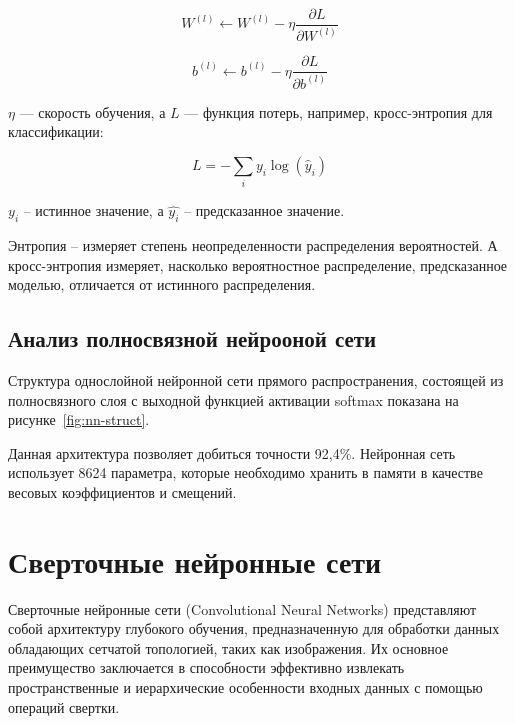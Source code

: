 \begin{equation}
    W^{(l)} \leftarrow W^{(l)} - \eta \frac{\partial L}{\partial W^{(l)}}
\end{equation}

\begin{equation}
    b^{(l)} \leftarrow b^{(l)} - \eta \frac{\partial L}{\partial b^{(l)}}
\end{equation}

 $\eta$ — скорость обучения, а $L$ — функция потерь, например, 
кросс-энтропия для классификации:

\begin{equation}
    L = - \sum_{i} y_i \log(\hat{y}_i)
\end{equation}

 \( y_i \) – истинное значение, а \( \hat{y_i} \) – предсказанное 
значение.

Энтропия – измеряет степень неопределенности распределения вероятностей. А 
кросс-энтропия измеряет, насколько вероятностное распределение, предсказанное 
моделью, отличается от истинного распределения.

\subsection{Анализ полносвязной нейрооной сети}
\hspace*{12.5 mm}Структура однослойной нейронной сети прямого распространения, 
состоящей из полносвязного слоя с выходной функцией активации softmax показана 
на рисунке~\ref{fig:nn-struct}.


Данная архитектура позволяет добиться точности 92,4\%\cite{Doc}. Нейронная сеть 
использует 8624 параметра, которые необходимо хранить в памяти в качестве 
весовых коэффициентов и смещений.

\section{Сверточные нейронные сети}
\hspace*{12.5 mm}
Сверточные нейронные сети (Convolutional Neural Networks) представляют собой 
архитектуру глубокого обучения, предназначенную для обработки данных обладающих 
сетчатой топологией, таких как изображения. Их основное преимущество 
заключается в способности эффективно извлекать пространственные и иерархические 
особенности входных данных с помощью операций свертки.


